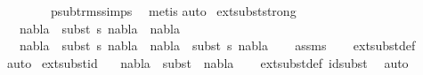 \begin{isabellebody}
\ \ \ \ \ \ \ \ psub{\isacharunderscore}{\kern0pt}trms{\isachardot}{\kern0pt}simps{\isacharparenleft}{\kern0pt}{}{\isacharparenright}{\kern0pt}\ \isamarkupfalse%
\ {\isacharparenleft}{\kern0pt}metis{\isacharparenright}{\kern0pt}\isanewline
{}\isamarkupfalse%
{\isacharparenleft}{\kern0pt}auto{\isacharparenright}{\kern0pt}%
\endisatagproof
{\isafoldproof}%
%
\isadelimproof
\isanewline
%
\endisadelimproof
\isanewline
{}\isamarkupfalse%
\ ext{\isacharunderscore}{\kern0pt}subst{\isacharunderscore}{\kern0pt}strong{\isacharcolon}{\kern0pt}\isanewline
\ \ \ {\isachardoublequoteopen}nabla{}\ {\isasymTurnstile}\ {\isacharparenleft}{\kern0pt}subst\ s{\isacharparenright}{\kern0pt}\ {\isacharparenleft}{\kern0pt}nabla{}\ {\isasymunion}\ nabla{}{\isacharparenright}{\kern0pt}{\isachardoublequoteclose}\isanewline
\ \ \ {\isachardoublequoteopen}nabla{}\ {\isasymTurnstile}\ {\isacharparenleft}{\kern0pt}subst\ s{\isacharparenright}{\kern0pt}\ {\isacharparenleft}{\kern0pt}nabla{}{\isacharparenright}{\kern0pt}{\isachardoublequoteclose}\ \ {\isachardoublequoteopen}nabla{}\ {\isasymTurnstile}\ {\isacharparenleft}{\kern0pt}subst\ s{\isacharparenright}{\kern0pt}\ {\isacharparenleft}{\kern0pt}nabla{}{\isacharparenright}{\kern0pt}{\isachardoublequoteclose}\isanewline
%
\isadelimproof
\ \ %
\endisadelimproof
%
\isatagproof
{}\isamarkupfalse%
\ assms\isanewline
\ \ \isamarkupfalse%
\ ext{\isacharunderscore}{\kern0pt}subst{\isacharunderscore}{\kern0pt}def\ \isamarkupfalse%
\ auto%
\endisatagproof
{\isafoldproof}%
%
\isadelimproof
\isanewline
%
\endisadelimproof
\isanewline
{}\isamarkupfalse%
\ ext{\isacharunderscore}{\kern0pt}subst{\isacharunderscore}{\kern0pt}id{\isacharcolon}{\kern0pt}\isanewline
\ \ \ {\isachardoublequoteopen}nabla\ {\isasymTurnstile}\ {\isacharparenleft}{\kern0pt}subst\ {\isacharbrackleft}{\kern0pt}{\isacharbrackright}{\kern0pt}{\isacharparenright}{\kern0pt}\ nabla{\isachardoublequoteclose}\isanewline
%
\isadelimproof
\ \ %
\endisadelimproof
%
\isatagproof
{}\isamarkupfalse%
\ ext{\isacharunderscore}{\kern0pt}subst{\isacharunderscore}{\kern0pt}def\ id{\isacharunderscore}{\kern0pt}subst\ \isamarkupfalse%
\ auto%
\endisatagproof
{\isafoldproof}%
%
\isadelimproof
\isanewline
%
\endisadelimproof
%
\isadelimtheory
\isanewline
%
\endisadelimtheory
%
\isatagtheory
{}\isamarkupfalse%
%
\endisatagtheory
{\isafoldtheory}%
%
\isadelimtheory
%
\endisadelimtheory
%
\end{isabellebody}%
